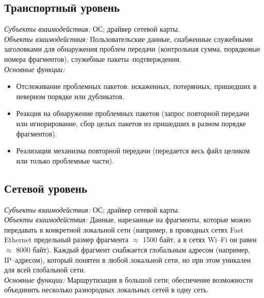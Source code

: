 \subsection{Транспортный уровень}
\emph{Субъекты взаимодействия:} ОС; драйвер сетевой карты.
\\\emph{Объекты взаимодействия:} Пользовательские данные, снабженные служебными заголовками для обнаружения проблем передачи (контрольная сумма, порядковые номера фрагментов), служебные пакеты--подтверждения.
\\\emph{Основные функции:}
\begin{itemize}
  \item Отслеживание проблемных пакетов: искаженных, потерянных, пришедших в неверном порядке или дубликатов.
  \item Реакция на обнаружение проблемных пакетов (запрос повторной передачи или игнорирование, сбор целых пакетов из пришедших в разном порядке фрагментов).
  \item Реализация механизма повторной передачи (передается весь файл целиком или только проблемные части).
\end{itemize}
\subsection{Сетевой уровень}
\emph{Субъекты взаимодействия:} ОС; драйвер сетевой карты.
\\\emph{Объекты взаимодействия:} Данные, нарезанные на фрагменты, которые можно передавать в конкретной локальной сети (например, в
проводных сетях Fast Ethernet предельный размер фрагмента $\approx$ 1500 байт, а в сетях Wi--Fi он равен $\approx$ 8000 байт). Каждый фрагмент снабжается глобальным адресом (например, IP--адресом), который понятен в любой локальной сети, но при этом уникален для всей
глобальной сети.
\\\emph{Основные функции:} Маршрутизация в большой сети; обеспечение возможности объединить несколько разнородных локальных сетей в одну сеть.
